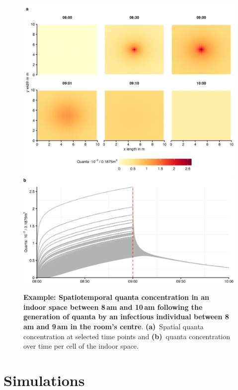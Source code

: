 \documentclass[fleqn,11pt]{wlscirep_supp}
\begin{document}
\begin{figure}[!htpb]
    \centering
    \includegraphics{tests/stm_v2-toy_example.png}
    \includegraphics{tests/stm_v2-toy_example-B.png}
    \caption[Example: Spatiotemporal quanta concentration in an indoor space]{\textbf{Example: Spatiotemporal quanta concentration in an indoor space between 8\,am and 10\,am following the generation of quanta by an infectious individual between 8\,am and 9\,am in the room's centre}. \textbf{(a)}~Spatial quanta concentration at selected time points and \textbf{(b)}~quanta concentration over time per cell of the indoor space.}
    \label{fig:toy-example}
\end{figure}

\clearpage


\section{Simulations}\label{sec:estimation}
\end{document}
